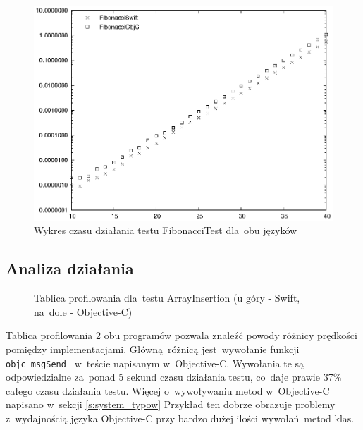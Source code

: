 \documentclass[mgr, shortabstract]{iithesis}
\newcommand{\objcinline}[1]{
    \texttt{#1}
}
\begin{document}
\begin{figure}[ht]
    \includegraphics{plots/Fibonacci.eps}
    \caption{Wykres czasu działania testu FibonacciTest dla~obu języków}
    \label{p:fibonacci}
\end{figure}

\subsection{Analiza działania}

\begin{figure}
    \caption{Tablica profilowania dla~testu ArrayInsertion (u góry - Swift, na~dole - Objective-C)}
    \label{i:fibonacci}
\end{figure}

Tablica profilowania \ref{i:fibonacci} obu programów pozwala znaleźć powody różnicy prędkości pomiędzy implementacjami. Główną różnicą jest~wywołanie funkcji \objcinline{objc_msgSend } w~teście napisanym w~Objective-C. Wywołania te są odpowiedzialne za~ponad 5 sekund czasu działania testu, co~daje prawie 37\% całego czasu działania testu. Więcej o~wywoływaniu metod w~Objective-C napisano w~sekcji \ref{s:system_typow} Przykład ten dobrze obrazuje problemy z~wydajnością języka Objective-C przy bardzo dużej ilości wywołań metod klas.
\end{document}
